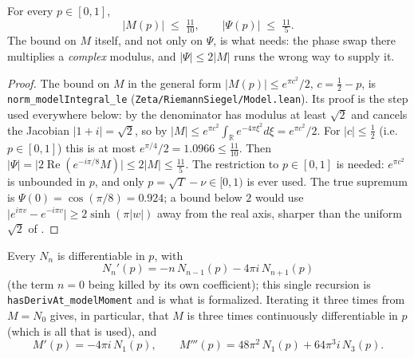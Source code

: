 \begin{lemma}
\label{lem:rsf_correction_bound}
\leanok
{}
For every $p\in[0,1]$,
\[
  \lvert M(p)\rvert\;\le\;\tfrac{11}{10},\qquad\lvert\Psi(p)\rvert\;\le\;\tfrac{11}5 .
\]
The bound on $M$ itself, and not only on $\Psi$, is what
 needs: the phase swap there multiplies a \emph{complex} modulus,
and $\lvert\Psi\rvert\le2\lvert M\rvert$ runs the wrong way to supply it.
\end{lemma}

\begin{proof}
\leanok
{}
The bound on $M$ in the general form $\lvert M(p)\rvert\le e^{\pi c^{2}}/2$, $c=\tfrac12-p$, is
\texttt{norm\_modelIntegral\_le} (\texttt{Zeta/RiemannSiegel/Model.lean}).  Its proof is the
step used everywhere below: by  the denominator has modulus at least
$\sqrt2$ and cancels the Jacobian $\lvert1+i\rvert=\sqrt2$, so by 
$\lvert M\rvert\le e^{\pi c^{2}}\int_{\mathbb{R}}e^{-4\pi\xi^{2}}d\xi=e^{\pi c^{2}}/2$.  For
$\lvert c\rvert\le\tfrac12$ (i.e.\ $p\in[0,1]$) this is at most
$e^{\pi/4}/2=1.0966\le\tfrac{11}{10}$.
Then $\lvert\Psi\rvert=\lvert2\operatorname{Re}(e^{-i\pi/8}M)\rvert\le2\lvert
M\rvert\le\tfrac{11}5$.  The restriction to $p\in[0,1]$ is needed: $e^{\pi c^{2}}$ is
unbounded in $p$, and only $p=\sqrt T-\nu\in[0,1)$ is ever used.  The true supremum is
$\Psi(0)=\cos(\pi/8)=0.924$;
a bound below $2$ would use $\lvert e^{i\pi v}-e^{-i\pi v}\rvert\ge2\sinh(\pi\lvert
w\rvert)$ away from the real axis, sharper than the uniform $\sqrt2$ of .
\end{proof}

\begin{lemma}
\label{lem:rsf_moment_deriv}
\leanok
{}
Every $N_{n}$ is differentiable in $p$, with
\[
  N_{n}'(p)=-n\,N_{n-1}(p)-4\pi i\,N_{n+1}(p)
\]
(the term $n=0$ being killed by its own coefficient); this single recursion is
\texttt{hasDerivAt\_modelMoment} and is what is formalized.  Iterating it three times from
$M=N_{0}$ gives, in particular, that $M$ is three times continuously differentiable in $p$
(which is all that is used), and
\[
  M'(p)=-4\pi i\,N_{1}(p),\qquad
  M'''(p)=48\pi^{2}\,N_{1}(p)+64\pi^{3}i\,N_{3}(p).
\]
\end{lemma}

